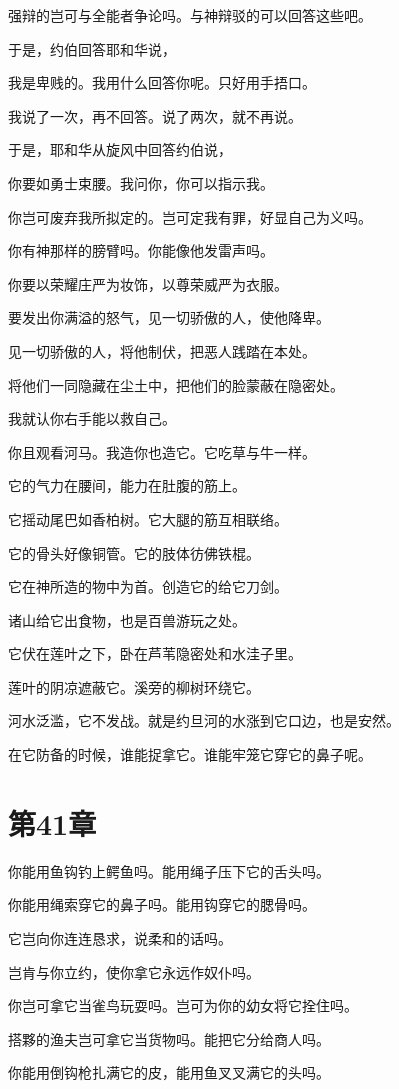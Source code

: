 \documentclass[12pt,oneside]{book}
\begin{document}
强辩的岂可与全能者争论吗。与神辩驳的可以回答这些吧。

于是，约伯回答耶和华说，

我是卑贱的。我用什么回答你呢。只好用手捂口。

我说了一次，再不回答。说了两次，就不再说。

于是，耶和华从旋风中回答约伯说，

你要如勇士束腰。我问你，你可以指示我。

你岂可废弃我所拟定的。岂可定我有罪，好显自己为义吗。

你有神那样的膀臂吗。你能像他发雷声吗。

你要以荣耀庄严为妆饰，以尊荣威严为衣服。

要发出你满溢的怒气，见一切骄傲的人，使他降卑。

见一切骄傲的人，将他制伏，把恶人践踏在本处。

将他们一同隐藏在尘土中，把他们的脸蒙蔽在隐密处。

我就认你右手能以救自己。

你且观看河马。我造你也造它。它吃草与牛一样。

它的气力在腰间，能力在肚腹的筋上。

它摇动尾巴如香柏树。它大腿的筋互相联络。

它的骨头好像铜管。它的肢体彷佛铁棍。

它在神所造的物中为首。创造它的给它刀剑。

诸山给它出食物，也是百兽游玩之处。

它伏在莲叶之下，卧在芦苇隐密处和水洼子里。

莲叶的阴凉遮蔽它。溪旁的柳树环绕它。

河水泛滥，它不发战。就是约旦河的水涨到它口边，也是安然。

在它防备的时候，谁能捉拿它。谁能牢笼它穿它的鼻子呢。


\chapter{第41章}
你能用鱼钩钓上鳄鱼吗。能用绳子压下它的舌头吗。

你能用绳索穿它的鼻子吗。能用钩穿它的腮骨吗。

它岂向你连连恳求，说柔和的话吗。

岂肯与你立约，使你拿它永远作奴仆吗。

你岂可拿它当雀鸟玩耍吗。岂可为你的幼女将它拴住吗。

搭夥的渔夫岂可拿它当货物吗。能把它分给商人吗。

你能用倒钩枪扎满它的皮，能用鱼叉叉满它的头吗。
\end{document}

